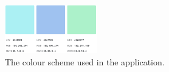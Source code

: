 \begin{figure}[H]

	\centering
	\includegraphics[width=4cm]{./graphics/design/Colours.png}
	\caption{The colour scheme used in the application.}
	\label{fig:colour_scheme}
	
\end{figure}